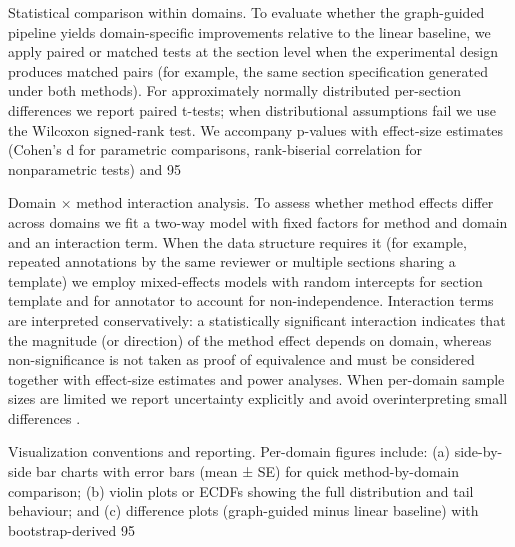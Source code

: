 Statistical comparison within domains. To evaluate whether the graph-guided pipeline yields domain-specific improvements relative to the linear baseline, we apply paired or matched tests at the section level when the experimental design produces matched pairs (for example, the same section specification generated under both methods). For approximately normally distributed per-section differences we report paired t-tests; when distributional assumptions fail we use the Wilcoxon signed-rank test. We accompany p-values with effect-size estimates (Cohen's d for parametric comparisons, rank-biserial correlation for nonparametric tests) and 95%

Domain × method interaction analysis. To assess whether method effects differ across domains we fit a two-way model with fixed factors for method and domain and an interaction term. When the data structure requires it (for example, repeated annotations by the same reviewer or multiple sections sharing a template) we employ mixed-effects models with random intercepts for section template and for annotator to account for non-independence. Interaction terms are interpreted conservatively: a statistically significant interaction indicates that the magnitude (or direction) of the method effect depends on domain, whereas non-significance is not taken as proof of equivalence and must be considered together with effect-size estimates and power analyses. When per-domain sample sizes are limited we report uncertainty explicitly and avoid overinterpreting small differences \cite{web_gros_2025_per_domain_generalizing_policies_on_validation_i}.

Visualization conventions and reporting. Per-domain figures include: (a) side-by-side bar charts with error bars (mean ± SE) for quick method-by-domain comparison; (b) violin plots or ECDFs showing the full distribution and tail behaviour; and (c) difference plots (graph-guided minus linear baseline) with bootstrap-derived 95%

